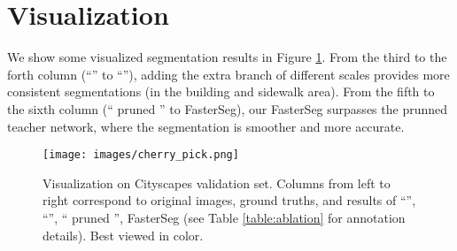 \documentclass{article} \usepackage{iclr2020_conference,times}
\begin{document}
\section{Visualization}\vspace{-0.7em} \label{app:viz}
We show some visualized segmentation results in Figure \ref{fig:cherry_pick}. From the third to the forth column (``'' to ``''), adding the extra branch of different scales provides more consistent segmentations (in the building and sidewalk area). From the fifth to the sixth column (`` pruned '' to FasterSeg), our FasterSeg surpasses the prunned teacher network, where the segmentation is smoother and more accurate.

\begin{figure}[ht]
\texttt{[image: images/cherry\_pick.png]}
\centering \vspace{-0.1in}
\caption{Visualization on Cityscapes validation set. Columns from left to right correspond to original images, ground truths, and results of ``'', ``'', `` pruned '', FasterSeg (see Table \ref{table:ablation} for annotation details). Best viewed in color.}
\label{fig:cherry_pick}
\end{figure}
\end{document}
